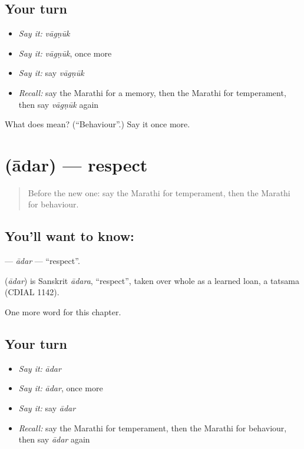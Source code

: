 \subsection*{Your turn}
\begin{itemize}
\raggedright
  \item \emph{Say it:} \emph{vāgṇūk}
  \item \emph{Say it:} \emph{vāgṇūk}, once more
  \item \emph{Say it:} say \emph{vāgṇūk}
  \item \emph{Recall:} say the Marathi for a memory, then the Marathi for temperament, then say \emph{vāgṇūk} again
\end{itemize}

\begin{tcolorbox}[breakable,colback=teal!4,colframe=teal!35!black,title={Before you move on}]
What does  mean? (\textquotedblleft{}Behaviour\textquotedblright{}.) Say it once more.
\end{tcolorbox}
\section[\texorpdfstring{\mr{आदर} (ādar)}{आदर (ādar)}]{ (ādar) — respect}

\label{lesson:MR-C273-adar}



\begin{quote}
Before the new one: say the Marathi for temperament, then the Marathi for behaviour.
\end{quote}

\subsection*{You'll want to know: }
\textbf{} — \emph{ādar} — \textquotedblleft{}respect\textquotedblright{}.

\begin{cousinweb}
\textbf{} (\emph{ādar}) is Sanskrit \emph{ādara}, \textquotedblleft{}respect\textquotedblright{}, taken over whole as a learned loan, a tatsama (CDIAL 1142).
\end{cousinweb}

\begin{grammarlens}[title={What you've built}]
One more word for this chapter.
\end{grammarlens}

\subsection*{Your turn}
\begin{itemize}
\raggedright
  \item \emph{Say it:} \emph{ādar}
  \item \emph{Say it:} \emph{ādar}, once more
  \item \emph{Say it:} say \emph{ādar}
  \item \emph{Recall:} say the Marathi for temperament, then the Marathi for behaviour, then say \emph{ādar} again
\end{itemize}

